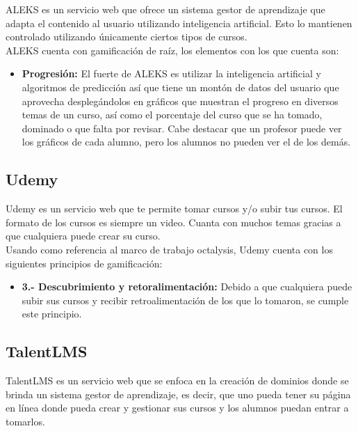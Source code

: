 \begin{multicols}{2}
    ALEKS es un servicio web que ofrece un sistema gestor de aprendizaje  que adapta el contenido al usuario utilizando inteligencia artificial. Esto lo mantienen controlado utilizando únicamente ciertos tipos de cursos.\\
    
    \noindent ALEKS cuenta con gamificación de raíz, los elementos con los que cuenta son:
    
    \begin{itemize}
        \item \textbf{Progresión: } El fuerte de ALEKS es utilizar la inteligencia artificial y algoritmos de predicción así que tiene un montón de datos del usuario que aprovecha desplegándolos en gráficos que muestran el progreso en diversos temas de un curso, así como el porcentaje del curso que se ha tomado, dominado o que falta por revisar. Cabe destacar que un profesor puede ver los gráficos de cada alumno, pero los alumnos no pueden ver el de los demás.
    \end{itemize}
\subsection*{Udemy}

    Udemy es un servicio web que te permite tomar cursos y/o subir tus cursos. El formato de los cursos es siempre un video. Cuanta con muchos temas gracias a que cualquiera puede crear su curso.\\
    \noindent Usando como referencia al marco de trabajo octalysis, Udemy cuenta con los siguientes principios de gamificación:
    \begin{itemize}
        \item \textbf{ 3.- Descubrimiento y retoralimentación: } Debido a que cualquiera puede subir sus cursos y recibir retroalimentación de los que lo tomaron, se cumple este principio.
    \end{itemize}
    
\subsection*{TalentLMS}

    TalentLMS es un servicio web que se enfoca en la creación de dominios donde se brinda un sistema gestor de aprendizaje, es decir, que uno pueda tener su página en línea donde pueda crear y gestionar sus cursos y los alumnos puedan entrar a tomarlos.\\
    

\end{multicols}

